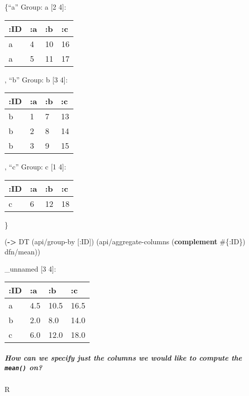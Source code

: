 \documentclass[]{article}
\newenvironment{Shaded}{\begin{snugshade}}{\end{snugshade}}
\newcommand{\AttributeTok}[1]{\textcolor[rgb]{0.77,0.63,0.00}{#1}}
\newcommand{\KeywordTok}[1]{\textcolor[rgb]{0.13,0.29,0.53}{\textbf{#1}}}
\newcommand{\NormalTok}[1]{#1}
\let\oldsubparagraph\subparagraph
\renewcommand{\subparagraph}[1]{\oldsubparagraph{#1}\mbox{}}
\begin{document}
\{``a'' Group: a {[}2 4{]}:

\begin{longtable}[]{@{}llll@{}}
\toprule
:ID & :a & :b & :c\tabularnewline
\midrule
\endhead
a & 4 & 10 & 16\tabularnewline
a & 5 & 11 & 17\tabularnewline
\bottomrule
\end{longtable}

, ``b'' Group: b {[}3 4{]}:

\begin{longtable}[]{@{}llll@{}}
\toprule
:ID & :a & :b & :c\tabularnewline
\midrule
\endhead
b & 1 & 7 & 13\tabularnewline
b & 2 & 8 & 14\tabularnewline
b & 3 & 9 & 15\tabularnewline
\bottomrule
\end{longtable}

, ``c'' Group: c {[}1 4{]}:

\begin{longtable}[]{@{}llll@{}}
\toprule
:ID & :a & :b & :c\tabularnewline
\midrule
\endhead
c & 6 & 12 & 18\tabularnewline
\bottomrule
\end{longtable}

\}

\begin{Shaded}
\begin{Highlighting}[]
\NormalTok{(}\KeywordTok{->}\NormalTok{ DT}
\NormalTok{    (api/group-by [}\AttributeTok{:ID}\NormalTok{])}
\NormalTok{    (api/aggregate-columns (}\KeywordTok{complement}\NormalTok{ #\{}\AttributeTok{:ID}\NormalTok{\}) dfn/mean))}
\end{Highlighting}
\end{Shaded}

\_unnamed {[}3 4{]}:

\begin{longtable}[]{@{}llll@{}}
\toprule
:ID & :a & :b & :c\tabularnewline
\midrule
\endhead
a & 4.5 & 10.5 & 16.5\tabularnewline
b & 2.0 & 8.0 & 14.0\tabularnewline
c & 6.0 & 12.0 & 18.0\tabularnewline
\bottomrule
\end{longtable}

\hypertarget{how-can-we-specify-just-the-columns-we-would-like-to-compute-the-mean-on}{%
\subparagraph{\texorpdfstring{How can we specify just the columns we
would like to compute the \texttt{mean()}
on?}{How can we specify just the columns we would like to compute the mean() on?}}\label{how-can-we-specify-just-the-columns-we-would-like-to-compute-the-mean-on}}

R
\end{document}
